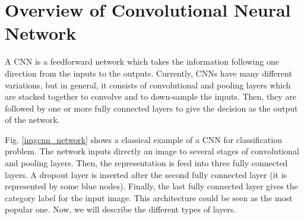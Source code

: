 \documentclass[review]{elsarticle}
\begin{document}


\section{Overview of Convolutional Neural Network}
\label{sOverview}
A CNN is a feedforward network which takes the information following one direction from the inputs to the outputs. Currently, CNNs have many different variations, but in general, it consists of convolutional and pooling layers which are stacked together to convolve and to down-sample the inputs. Then, they are followed by one or more fully connected layers to give the decision as the output of the network. 

Fig. \ref{imgcnn_network} shows a classical example of a CNN for classification problem. The network inputs directly an image to several stages of convolutional and pooling layers. Then, the representation is feed into three fully connected layers. A dropout layer is inserted after the second fully connected layer (it is represented by some blue nodes). Finally, the last fully connected layer gives the category label for the input image. This architecture could be seen as the most popular one. Now, we will describe the different types of layers.
\end{document}
